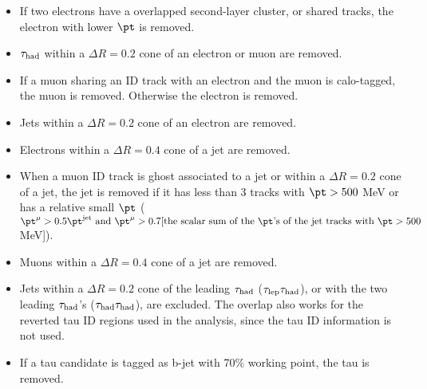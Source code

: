 \begin{itemize}
\item If two electrons have a overlapped second-layer cluster, or shared tracks, the electron with lower $\pt$ is removed.
\item $\tau_\text{had}$ within a $\Delta R=0.2$ cone of an electron or muon are removed.
\item If a muon sharing an ID track with an electron and the muon is calo-tagged, the muon is removed. Otherwise the electron is removed.
\item Jets within a $\Delta R=0.2$ cone of an electron are removed.
\item Electrons within a $\Delta R=0.4$ cone of a jet are removed.
\item When a muon ID track is ghost associated to a jet or within a $\Delta R=0.2$ cone of a jet, the jet is removed if it has less than 3 tracks with $\pt>500$ MeV or has a relative small $\pt$ ($\pt^{\mu}>0.5\pt^{\text{jet}} \text{ and } \pt^{\mu}>0.7[\text{the scalar sum of the } \pt \text{'s of the jet tracks with } \pt>500$ MeV]).
\item Muons within a $\Delta R=0.4$ cone of a jet are removed.
\item Jets within a $\Delta R=0.2$ cone of the leading $\tau_\text{had}$ ($\tau_\text{lep}{}\tau_\text{had}$), or with the two leading $\tau_\text{had}$'s ($\tau_\text{had}{}\tau_\text{had}$), are excluded. The overlap also works for the reverted tau ID regions used in the analysis, since the tau ID information is not used.
\item If a tau candidate is tagged as b-jet with 70\% working point, the tau is removed.
\end{itemize}

